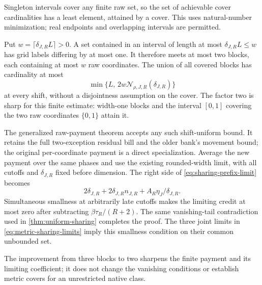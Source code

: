 \begin{outline}
Singleton intervals cover any finite raw set, so the set of achievable
cover cardinalities has a least element, attained by a cover. This uses
natural-number minimization; real endpoints and overlapping intervals
are permitted.

Put $w=\lceil\delta_{J,R}L\rceil>0$. A set contained in an interval of
length at most $\delta_{J,R}L\le w$ has grid labels differing by at most
one. It therefore meets at most two blocks, each containing at most $w$
raw coordinates. The union of all covered blocks has cardinality at most
\[
 \min\{L,\,2w\mathcal N_{\rho,J,R}(\delta_{J,R})\}
\]
at every shift, without a disjointness assumption on the cover. The factor
two is sharp for this finite estimate: width-one blocks and the interval
$[0,1]$ covering the two raw coordinates $\{0,1\}$ attain it.

The generalized raw-payment theorem accepts any such shift-uniform bound.
It retains the full two-exception residual bill and the older bank's
movement bound; the original per-coordinate payment is a direct
specialization. Average the new payment over the same phases and use the
existing rounded-width limit, with all cutoffs and $\delta_{J,R}$ fixed
before dimension. The right side of \cref{eq:sharing-prefix-limit} becomes
\[
 2\delta_{J,R}+2\delta_{J,R}n_{J,R}
              +A_R\eta_J/\delta_{J,R}.
\]
Simultaneous smallness at arbitrarily late cutoffs makes the limiting
credit at most zero after subtracting $\beta\tau_R/(R+2)$. The same
vanishing-tail contradiction used in \cref{thm:uniform-sharing} completes
the proof. The three joint limits in \cref{eq:metric-sharing-limits}
imply this smallness condition on their common unbounded set.
\end{outline}

The improvement from three blocks to two sharpens the finite payment
and its limiting coefficient; it does not change the vanishing conditions
or establish metric covers for an unrestricted native class.

